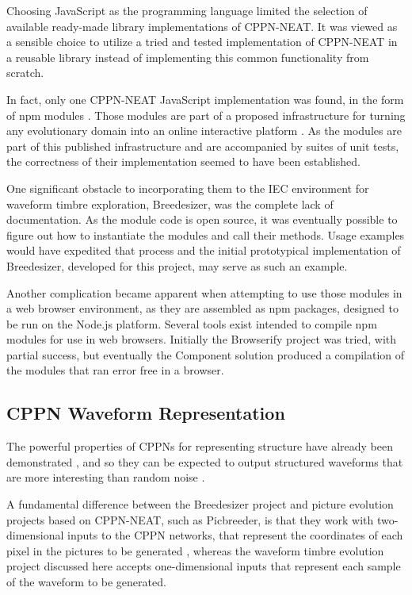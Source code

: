 \documentclass[conference]{IEEEtran}
\begin{document}
Choosing JavaScript as the programming language limited the selection of available ready-made library implementations of CPPN-NEAT.  It was viewed as a sensible choice to utilize a tried and tested implementation of CPPN-NEAT in a reusable library instead of implementing this common functionality from scratch.  

In fact, only one CPPN-NEAT JavaScript implementation was found, in the form of npm modules \cite{npmAcronym}.  Those modules are part of a proposed infrastructure for turning any evolutionary domain into an online interactive platform \cite{szerlip2014proposed}\cite{szerlip2014steps}.  As the modules are part of this published infrastructure and are accompanied by suites of unit tests, the correctness of their implementation seemed to have been established.  

One significant obstacle to incorporating them to the IEC environment for waveform timbre exploration, Breedesizer, was the complete lack of documentation.  As the module code is open source, it was eventually possible to figure out how to instantiate the modules and call their methods.  Usage examples would have expedited that process and the initial prototypical implementation of Breedesizer, developed for this project, may serve as such an example.

Another complication became apparent when attempting to use those modules in a web browser environment, as they are assembled as npm packages, designed to be run on the Node.js platform.  Several tools exist intended to compile npm modules for use in web browsers.  Initially the Browserify \cite{browserify} project was tried, with partial success, but eventually the Component solution \cite{component} produced a compilation of the modules that ran error free in a browser.


\subsection{CPPN Waveform Representation}
\label{sec:CPPNWaveformRepresentation}

The powerful properties of CPPNs for representing structure have already been demonstrated \cite{stanley2007compositional}\cite{secretan2011picbreeder}, and so they can be expected to output structured waveforms that are more interesting than random noise \cite{WaveformAndTimbre}.

A fundamental difference between the Breedesizer project and picture evolution projects based on CPPN-NEAT, such as Picbreeder, is that they work with two-dimensional inputs to the CPPN networks, that represent the coordinates of each pixel in the pictures to be generated \cite{PicbreederAnalyzeImageDNA}, whereas the waveform timbre evolution project discussed here accepts one-dimensional inputs that represent each sample of the waveform to be generated.
\end{document}
